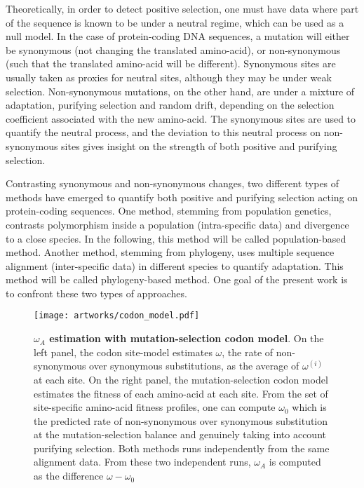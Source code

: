 \documentclass{article}
\begin{document}
Theoretically, in order to detect positive selection, one must have data where part of the sequence is known to be under a neutral regime, which can be used as a null model.
In the case of protein-coding DNA sequences, a mutation will either be synonymous (not changing the translated amino-acid), or non-synonymous (such that the translated amino-acid will be different).
Synonymous sites are usually taken as proxies for neutral sites, although they may be under weak selection.
Non-synonymous mutations, on the other hand, are under a mixture of adaptation, purifying selection and random drift, depending on the selection coefficient associated with the new amino-acid.
The synonymous sites are used to quantify the neutral process, and the deviation to this neutral process on non-synonymous sites gives insight on the strength of both positive and purifying selection.

Contrasting synonymous and non-synonymous changes, two different types of methods have emerged to quantify both positive and purifying selection acting on protein-coding sequences.
One method, stemming from population genetics, contrasts polymorphism inside a population (intra-specific data) and divergence to a close species.
In the following, this method will be called population-based method.
Another method, stemming from phylogeny, uses multiple sequence alignment (inter-specific data) in different species to quantify adaptation.
This method will be called phylogeny-based method.
One goal of the present work is to confront these two types of approaches.
\begin{figure*}[hb!]
	\centering
	\texttt{[image: artworks/codon\_model.pdf]}
	\caption{ \textbf{$\omega_A$ estimation with mutation-selection codon model}.
On the left panel, the codon site-model estimates $\omega$, the rate of non-synonymous over synonymous substitutions, as the average of $\omega^{(i)}$ at each site.
On the right panel, the mutation-selection codon model estimates the fitness of each amino-acid at each site.
From the set of site-specific amino-acid fitness profiles, one can compute $\omega_{0}$ which is the predicted rate of non-synonymous over synonymous substitution at the mutation-selection balance and genuinely taking into account purifying selection.
Both methods runs independently from the same alignment data.
From these two independent runs, $\omega_A$ is computed as the difference $\omega - \omega_{0}$\label{fig:codon_model}}
\end{figure*}
\end{document}
